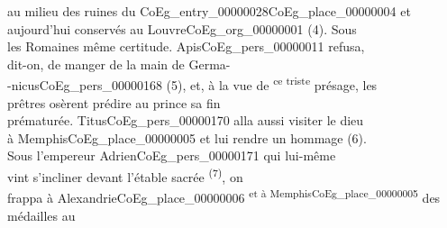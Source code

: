 \documentclass{book}
\begin{document}
{\begin{paracol}{2}
au milieu des ruines du \gls{CoEg_entry_00000028}\gls{CoEg_place_00000004} et\\
aujourd’hui conservés au Louvre\gls{CoEg_org_00000001} (4). Sous\\
les Romaines même certitude. Apis\gls{CoEg_pers_00000011} refusa,\\
dit-on, de manger de la main de Germa-\\
-nicus\gls{CoEg_pers_00000168} (5), et, à la vue de \textsuperscript{ce triste} présage, les\\
prêtres osèrent prédire au prince sa fin\\
prématurée. Titus\gls{CoEg_pers_00000170} alla aussi visiter le dieu\\
à Memphis\gls{CoEg_place_00000005} et lui rendre un hommage (6).\\
Sous l’empereur Adrien\gls{CoEg_pers_00000171} qui lui-même\\
vint s’incliner devant l’étable sacrée \textsuperscript{(7)}, on\\
frappa à Alexandrie\gls{CoEg_place_00000006} \textsuperscript{et à Memphis\gls{CoEg_place_00000005}} des médailles au
\end{paracol}

}
\end{document}
